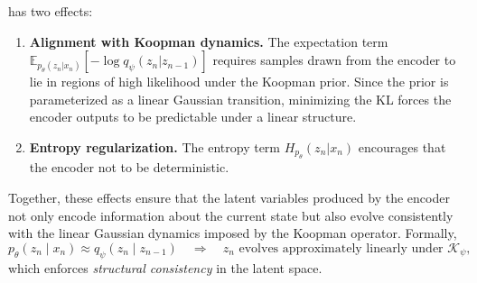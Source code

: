 \documentclass{article} %
\begin{document}
has two effects: 
\begin{enumerate}
    \item \textbf{Alignment with Koopman dynamics.}  
    The expectation term $\mathbb{E}_{p_\theta(z_n | x_n)}[-\log q_\psi(z_n | z_{n-1})]$ requires samples drawn from the encoder to lie in regions of high likelihood under the Koopman prior. Since the prior is parameterized as a linear Gaussian transition, minimizing the KL forces the encoder outputs to be predictable under a linear structure. 

    \item \textbf{Entropy regularization.}  
    The entropy term $H_{p_\theta}(z_n | x_n)$ encourages that the encoder not to be deterministic. 
\end{enumerate}

Together, these effects ensure that the latent variables produced by the encoder not only encode information about the current state but also evolve consistently with the linear Gaussian dynamics imposed by the Koopman operator. Formally, 
\[
p_\theta(z_n \mid x_n) \approx q_\psi(z_n \mid z_{n-1}) 
\quad \Longrightarrow \quad
z_n \text{ evolves approximately linearly under } \mathcal{K}_\psi,
\]
which enforces \emph{structural consistency} in the latent space.


\end{document}
